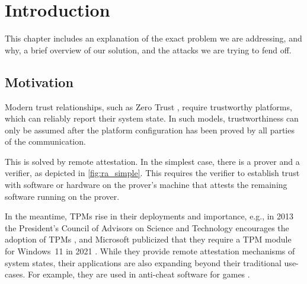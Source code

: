 
\chapter{Introduction}\label{chapter:introduction}

This chapter includes an explanation of the exact problem we are addressing, and why, a brief overview of our solution, and the attacks we are trying to fend off.


\section{Motivation}


Modern trust relationships, such as Zero Trust \cite{isaca2021}, require trustworthy platforms, which can reliably report their system state.
In such models, trustworthiness can only be assumed after the platform configuration has been proved by all parties of the communication.


This is solved by remote attestation. In the simplest case, there is a prover and a verifier, as depicted in \autoref{fig:ra_simple}. This requires the verifier to establish trust with software or hardware on the prover's machine that attests the remaining software running on the prover.




In the meantime, \acp{TPM} rise in their deployments and importance, e.g., in 2013 the President's Council of Advisors on Science and Technology encourages the adoption of TPMs \cite{usa}, and Microsoft publicized that they require a TPM module for Windows~11 in 2021 \cite{win11req}.
While they provide remote attestation mechanisms of system states, their applications are also expanding beyond their traditional use-cases. For example, they are used in anti-cheat software for games \cite{valorant}.


